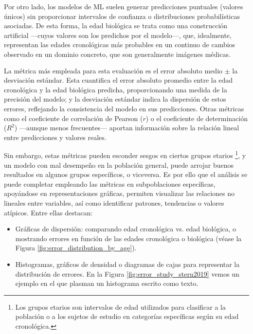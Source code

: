 Por otro lado, los modelos de ML suelen generar predicciones puntuales (valores únicos) sin proporcionar intervalos de confianza o distribuciones probabilísticas asociadas. De esta forma, la edad biológica se trata como una construcción artificial ---cuyos valores son los predichos por el modelo---, que, idealmente, representan las edades cronológicas más probables en un continuo de cambios observado en un dominio concreto, que son generalmente imágenes médicas. 

La métrica más empleada para esta evaluación es el error absoluto medio $\pm$ la desviación estándar. Esta cuantifica el error absoluto promedio entre la edad cronológica y la edad biológica predicha, proporcionando una medida de la precisión del modelo; y la desviación estándar indica la dispersión de estos errores, reflejando la consistencia del modelo en sus predicciones. Otras métricas como el coeficiente de correlación de Pearson ($r$) o el coeficiente de determinación ($R^2$) ---aunque menos frecuentes--- aportan información sobre la relación lineal entre predicciones y valores reales.

Sin embargo, estas métricas pueden esconder sesgos en ciertos grupos etarios%
\footnote{
    Los grupos etarios son intervalos de edad utilizados para clasificar a la población o a los sujetos de estudio en categorías específicas según su edad cronológica.
}, 
y un modelo con mal desempeño en la población general, puede arrojar buenos resultados en algunos grupos específicos, o viceversa. Es por ello que el análisis se puede completar empleando las métricas en subpoblaciones específicas, apoyándose en representaciones gráficas, permiten visualizar las relaciones no lineales entre variables, así como identificar patrones, tendencias o valores atípicos. Entre ellas destacan: 

\begin{itemize}

    \item Gráficas de dispersión: comparando edad cronológica vs. edad biológica, o mostrando errores en función de las edades cronológica o biológica (véase la Figura \ref{fig:error_distribution_by_age}).

    \item Histogramas, gráficos de densidad o diagramas de cajas para representar la distribución de errores. En la Figura \ref{fig:error_study_stern2019} vemos un ejemplo en el que plasman un histograma escrito como texto.

\end{itemize}

